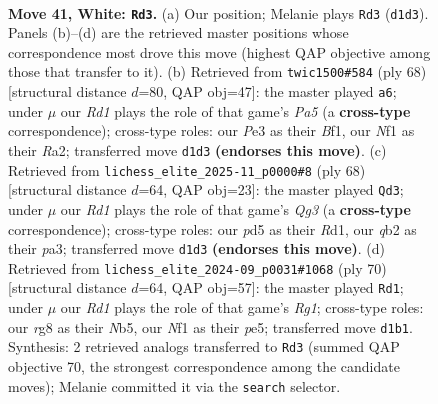 \documentclass[11pt]{article}
\begin{document}
\clearpage

\begin{figure}[p]\centering
\begin{subfigure}{0.46\textwidth}\centering
\resizebox{\linewidth}{!}{%
\newchessgame
\chessboard[
  setfen={r5r1/p5pp/2kb4/3p2QP/p2P2P1/1n2P2K/1q6/3R1N2 w - - 3 41},
  showmover=false,
  pgfstyle=straightmove, color=movearrow, markmove={d1-d3}
]}
\caption{}
\end{subfigure}\hfill
\begin{subfigure}{0.46\textwidth}\centering
\resizebox{\linewidth}{!}{%
\newchessgame
\chessboard[
  setfen={5rk1/6pp/1N1p4/P2P2q1/4Ppbn/8/R4QPP/5B1K w - - 4 35},
  showmover=false,
  pgfstyle=straightmove, color=movearrow, markmove={a5-a6}
]}
\caption{}
\end{subfigure}
\\[4pt]
\begin{subfigure}{0.46\textwidth}\centering
\resizebox{\linewidth}{!}{%
\newchessgame
\chessboard[
  setfen={r4r1k/7p/3p1bpP/3P4/qP2R3/p1P3Q1/N4P2/K2R4 w - - 5 35},
  showmover=false,
  pgfstyle=straightmove, color=movearrow, markmove={g3-d3}
]}
\caption{}
\end{subfigure}\hfill
\begin{subfigure}{0.46\textwidth}\centering
\resizebox{\linewidth}{!}{%
\newchessgame
\chessboard[
  setfen={2r3k1/1p4p1/5rPp/pN1pp3/P7/1QP2q2/1P6/K5R1 w - - 0 36},
  showmover=false,
  pgfstyle=straightmove, color=movearrow, markmove={g1-d1}
]}
\caption{}
\end{subfigure}
\caption{\textbf{Move 41, White: \texttt{Rd3}.} (a) Our position; Melanie plays \texttt{Rd3} (\texttt{d1d3}). Panels (b)--(d) are the retrieved master positions whose correspondence most drove this move (highest QAP objective among those that transfer to it). (b) Retrieved from \texttt{twic1500\#584} (ply 68) [structural distance $d$=80, QAP obj=47]: the master played \texttt{a6}; under $\mu$ our \emph{Rd1} plays the role of that game's \emph{Pa5} (a \textbf{cross-type} correspondence); cross-type roles: our \emph{P}e3 as their \emph{B}f1, our \emph{N}f1 as their \emph{R}a2; transferred move \texttt{d1d3} \textbf{(endorses this move)}. (c) Retrieved from \texttt{lichess\_elite\_2025-11\_p0000\#8} (ply 68) [structural distance $d$=64, QAP obj=23]: the master played \texttt{Qd3}; under $\mu$ our \emph{Rd1} plays the role of that game's \emph{Qg3} (a \textbf{cross-type} correspondence); cross-type roles: our \emph{p}d5 as their \emph{R}d1, our \emph{q}b2 as their \emph{p}a3; transferred move \texttt{d1d3} \textbf{(endorses this move)}. (d) Retrieved from \texttt{lichess\_elite\_2024-09\_p0031\#1068} (ply 70) [structural distance $d$=64, QAP obj=57]: the master played \texttt{Rd1}; under $\mu$ our \emph{Rd1} plays the role of that game's \emph{Rg1}; cross-type roles: our \emph{r}g8 as their \emph{N}b5, our \emph{N}f1 as their \emph{p}e5; transferred move \texttt{d1b1}. Synthesis: 2 retrieved analogs transferred to \texttt{Rd3} (summed QAP objective 70, the strongest correspondence among the candidate moves); Melanie committed it via the \texttt{search} selector.}
\label{fig:thought-m80}
\end{figure}
\end{document}
